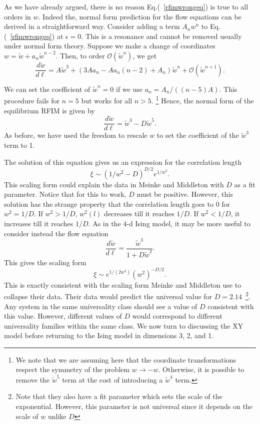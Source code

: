 \documentclass[
 reprint,
 amsmath,amssymb,
 aps, superscriptaddress, pre
]{revtex4-1}
\begin{document}
As we have already argued, there is no reason Eq.(~\ref{rfimwrongeq}) is true to all orders in $w$. Indeed the, normal form prediction for the flow equations can be derived in a straightforward way. Consider adding a term $A_n w^n$ to Eq.(~\ref{rfimwrongeq}) at $\epsilon = 0$. This is a resonance and cannot be removed usually under normal form theory.  Suppose we make a change of coordinates $w = \tilde{w} + a_n \tilde{w}^{n -2}$. Then, to order $\mathcal{O}(\tilde{w}^n)$, we get
\begin{equation}
 \frac{d \tilde w}{d \ell} = A \tilde{w}^3 + (3 A a_n - A a_n (n -2) + A_n) \tilde{w}^n + \mathcal{O}(\tilde{w}^{n+1}) .
\end{equation}

We can set the coefficient of $\tilde{w}^n = 0$ if we use $a_n = A_n/((n-5) A)$. This procedure fails for $n = 5$ but works for all $n > 5$. \footnote{We note that we are assuming here that the coordinate transformations respect the symmetry of the problem $w \rightarrow -w$. Otherwise, it is possible to remove the $\tilde{w}^5$ term at the cost of introducing a $\tilde{w}^4$ term.} Hence, the normal form of the equilibrium RFIM is given by 
\begin{equation}
 \frac{d \tilde w}{d \ell} = \tilde{w}^3 - D \tilde{w}^5 .
\end{equation}
As before, we have used the freedom to rescale $w$ to set the coefficient of the $\tilde{w}^3$ term to 1. 

The solution of this equation gives us an expression for the correlation length
\begin{equation}
 \xi \sim (1/w^2 - D)^{D/2} e^{1/w^2} .
\end{equation}
This scaling form could explain the data in Meinke and Middleton with $D$ as a fit parameter. Notice that for this to work, $D$ must be positive. However, this solution has the strange property that the correlation length goes to $0$ for $w^2 = 1/D$. If $w^2 > 1/D$, $w^2(l)$ decreases till it reaches $1/D$. If $w^2 < 1/D$, it increases till it reaches $1/D$. As in the 4-d Ising model, it may be more useful to consider instead the flow equation
\begin{equation}
\frac{d \tilde w}{d \ell} = \frac{\tilde{w}^3}{1 + D \tilde{w}^2} .
\end{equation}
This gives the scaling form 
\begin{equation}
 \xi \sim e^{1/(2 w^2)} (w^2)^{-D/2} .
\end{equation}
This is exactly consistent with the scaling form Meinke and Middleton use to collapse their data. Their data would predict the universal value for $D = 2.14$~\footnote{Note that they also have a fit parameter which sets the scale of the exponential. However, this parameter is not universal since it depends on the scale of $w$ unlike $D$}. Any system in the same universality class should see a value of $D$ consistent with this value. However, different values of $D$ would correspond to different universality families within the same class. We now turn to discussing the XY model before returning to the Ising model in dimensions 3, 2, and 1.
\end{document}
